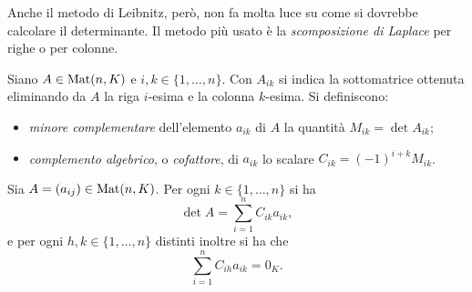 Anche il metodo di Leibnitz, però, non fa molta luce su come si dovrebbe calcolare il determinante.
Il metodo più usato è la \emph{scomposizione di Laplace} per righe o per colonne.
\begin{definizione} \label{d:minori-complementi}
	Siano $A\in\operatorname{Mat}(n,K)$ e $i,k\in\{1,\dots,n\}$.
	Con $A_{ik}$ si indica la sottomatrice ottenuta eliminando da $A$ la riga $i$-esima e la colonna $k$-esima.
	Si definiscono:
	\begin{itemize}
		\item \emph{minore complementare} dell'elemento $a_{ik}$ di $A$ la quantità $M_{ik}=\det A_{ik}$;
		\item \emph{complemento algebrico}, o \emph{cofattore}, di $a_{ik}$ lo scalare $C_{ik}=(-1)^{i+k}M_{ik}$.
	\end{itemize}
\end{definizione}
\begin{teorema}[di Laplace] \label{t:sviluppo-laplace}
	Sia $A=(a_{ij})\in\operatorname{Mat}(n,K)$.
	Per ogni $k\in\{1,\dots,n\}$ si ha
	\begin{equation} \label{eq:det-laplace1}
		\det A=\sum_{i=1}^nC_{ik}a_{ik},
	\end{equation}
	e per ogni $h,k\in\{1,\dots,n\}$ distinti inoltre si ha che
	\begin{equation} \label{eq:det-laplace2}
		\sum_{i=1}^nC_{ih}a_{ik}=0_K.
	\end{equation}
\end{teorema}

